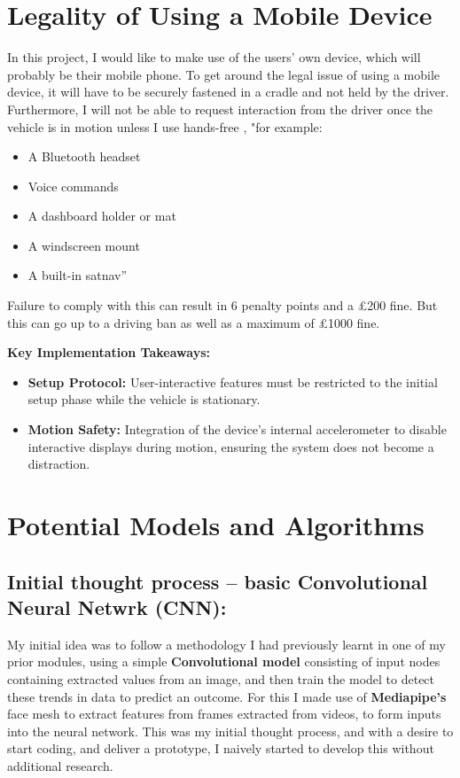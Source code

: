 \section{Legality of Using a Mobile Device}
In this project, I would like to make use of the users’ own device, which will probably be their mobile phone. To get
around the legal issue of using a mobile device, it will have to be securely fastened in a cradle and not held by the
driver. Furthermore, I will not be able to request interaction from the driver once the vehicle is in motion unless I
use hands-free \cite{gov_mobile_law}, "for example:
\begin{itemize}
    \item A Bluetooth headset
    \item Voice commands
    \item A dashboard holder or mat
    \item A windscreen mount
    \item A built-in satnav” 
\end{itemize}
Failure to comply with this can result in 6 penalty points and a £200 fine. But this can go up to a driving ban as
well as a maximum of £1000 fine.

\begin{mdframed}
\textbf{Key Implementation Takeaways:}
\begin{itemize}
    \item \textbf{Setup Protocol:} User-interactive features must be restricted to the initial setup phase while the
    vehicle is stationary.
    \item \textbf{Motion Safety:} Integration of the device's internal accelerometer to disable interactive displays
    during motion, ensuring the system does not become a distraction.
\end{itemize}
\end{mdframed}

\section{Potential Models and Algorithms}
\subsection{Initial thought process – basic Convolutional Neural Netwrk (CNN):}
My initial idea was to follow a methodology I had previously learnt in one of my prior modules, using a simple
\textbf{Convolutional model} consisting of input nodes containing extracted values from an image, and then train the model to
detect these trends in data to predict an outcome. For this I made use of \textbf{Mediapipe’s} face mesh to extract features from
frames extracted from videos, to form inputs into the neural network. This was my initial thought process, and with a desire
to start coding, and deliver a prototype, I naively started to develop this without additional research.

